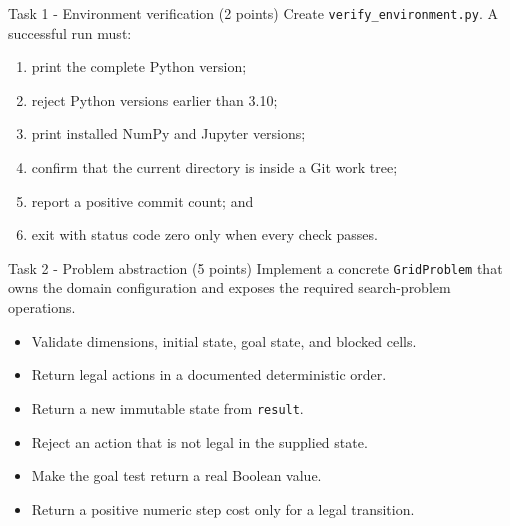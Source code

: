 \documentclass[aspectratio=169,11pt]{beamer}
\begin{document}
\begin{frame}{Task 1 - Environment verification (2 points)}
  Create \texttt{verify\_environment.py}. A successful run must:
  \begin{enumerate}
    \item print the complete Python version;
    \item reject Python versions earlier than 3.10;
    \item print installed NumPy and Jupyter versions;
    \item confirm that the current directory is inside a Git work tree;
    \item report a positive commit count; and
    \item exit with status code zero only when every check passes.
  \end{enumerate}
  \vspace{0.25cm}
\end{frame}

\begin{frame}{Task 2 - Problem abstraction (5 points)}
  Implement a concrete \texttt{GridProblem} that owns the domain configuration
  and exposes the required search-problem operations.

  \vspace{0.3cm}
  \begin{itemize}
    \item Validate dimensions, initial state, goal state, and blocked cells.
    \item Return legal actions in a documented deterministic order.
    \item Return a new immutable state from \texttt{result}.
    \item Reject an action that is not legal in the supplied state.
    \item Make the goal test return a real Boolean value.
    \item Return a positive numeric step cost only for a legal transition.
  \end{itemize}
\end{frame}
\end{document}
